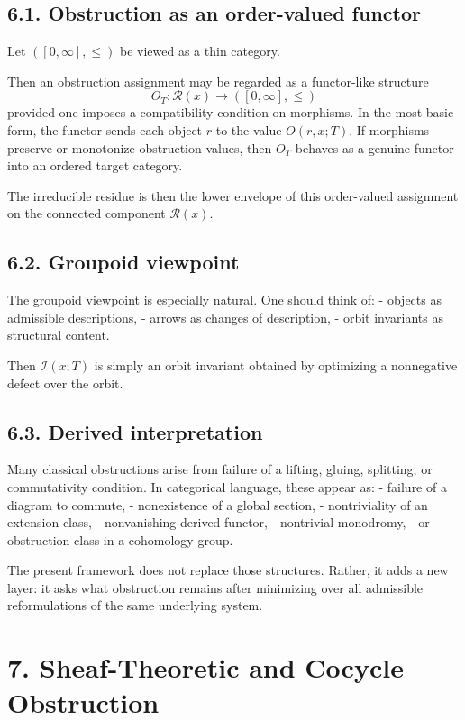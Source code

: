 \documentclass[
]{article}
\begin{document}
\subsection{6.1. Obstruction as an order-valued
functor}\label{obstruction-as-an-order-valued-functor}

Let \(([0,\infty], \le)\) be viewed as a thin category.

Then an obstruction assignment may be regarded as a functor-like
structure \[
O_T: \mathcal{R}(x) \to ([0,\infty],\le)
\] provided one imposes a compatibility condition on morphisms. In the
most basic form, the functor sends each object \(r\) to the value
\(O(r,x;T)\). If morphisms preserve or monotonize obstruction values,
then \(O_T\) behaves as a genuine functor into an ordered target
category.

The irreducible residue is then the lower envelope of this order-valued
assignment on the connected component \(\mathcal{R}(x)\).

\subsection{6.2. Groupoid viewpoint}\label{groupoid-viewpoint}

The groupoid viewpoint is especially natural. One should think of: -
objects as admissible descriptions, - arrows as changes of description,
- orbit invariants as structural content.

Then \(\mathcal{I}(x;T)\) is simply an orbit invariant obtained by
optimizing a nonnegative defect over the orbit.

\subsection{6.3. Derived interpretation}\label{derived-interpretation}

Many classical obstructions arise from failure of a lifting, gluing,
splitting, or commutativity condition. In categorical language, these
appear as: - failure of a diagram to commute, - nonexistence of a global
section, - nontriviality of an extension class, - nonvanishing derived
functor, - nontrivial monodromy, - or obstruction class in a cohomology
group.

The present framework does not replace those structures. Rather, it adds
a new layer: it asks what obstruction remains after minimizing over all
admissible reformulations of the same underlying system.

\section{7. Sheaf-Theoretic and Cocycle
Obstruction}\label{sheaf-theoretic-and-cocycle-obstruction}
\end{document}
